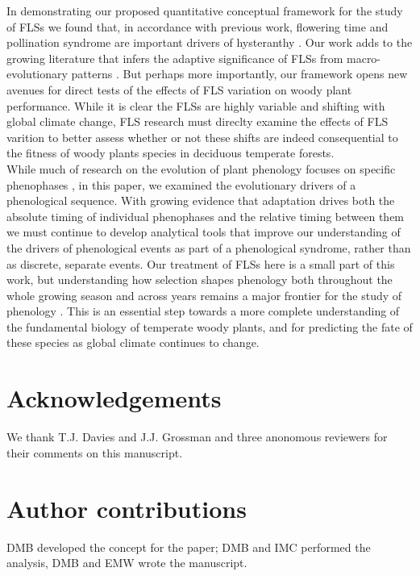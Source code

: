 \documentclass[11pt]{article}
\begin{document}
{\noindent In demonstrating our proposed quantitative conceptual framework for the study of FLSs we found that, in accordance with previous work, flowering time and pollination syndrome are important drivers of hysteranthy \citep{Gougherty2018}. Our work adds to the growing literature that infers the adaptive significance of FLSs from macro-evolutionary patterns \citep{}. But perhaps more importantly, our framework opens new avenues for direct tests of the effects of FLS variation on woody plant performance. While it is clear the FLSs are highly variable and shifting with global climate change, FLS research must direclty examine the effects of FLS varition to better assess whether or not these shifts are indeed consequential to the fitness of woody plants species in deciduous temperate forests.\\

\noindent While much of research on the evolution of plant phenology focuses on specific phenophases  \citep[e.g.][]{Savage2013,OLLERTON_1992}, in this paper, we examined the evolutionary drivers of a phenological sequence. With growing evidence that adaptation drives both the absolute timing of individual phenophases and the relative timing between them we must continue to develop analytical tools that improve our understanding of the drivers of phenological events as part of a phenological syndrome, rather than as discrete, separate events. 
Our treatment of FLSs here is a small part of this work, but understanding how selection shapes phenology both throughout the whole growing season and across years remains a major frontier for the study of phenology \citep{Wolkovich2014b}. This is an essential step towards a more complete understanding of the fundamental biology of temperate woody plants, and for predicting the fate of these species as global climate continues to change.


\section*{Acknowledgements}
\noindent We thank T.J. Davies and J.J. Grossman and three anonomous reviewers for their comments on this manuscript.

\section*{Author contributions}
DMB developed the concept for the paper; DMB and IMC performed the analysis, DMB and EMW wrote the manuscript.

}
\end{document}

